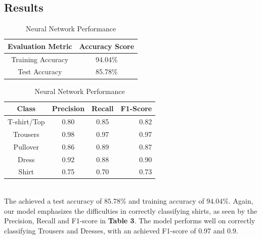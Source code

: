 \subsection{Results}\label{subsec:results}
\begin{table}[!ht]
\begin{subtable}[c]{0.4\textwidth}
\footnotesize
\centering
\begin{tabular}{ c | c }
 \toprule
 Evaluation Metric & Accuracy Score  \\
 \midrule
 Training Accuracy & 94.04\% \\
 Test Accuracy & 85.78\% \\
 \bottomrule
\end{tabular}
\captionsetup{justification=centering,margin=1cm}
\end{subtable}
\begin{subtable}[c]{0.6\textwidth}
\footnotesize
\centering
\begin{tabular}{c | c c r}
Class & Precision & Recall & F1-Score\\
\midrule
T-shirt/Top   &    0.80  &    0.85  &    0.82 \\
Trousers   &    0.98  &    0.97  &    0.97 \\
Pullover   &    0.86  &    0.89  &    0.87\\
Dress   &    0.92  &    0.88  &    0.90\\
Shirt   &    0.75  &    0.70  &    0.73\\
\end{tabular}
\captionsetup{justification=centering,margin=1cm}
\end{subtable}
\caption{Neural Network Performance}
\label{nn_evaluation}
\end{table}\\

The  achieved a test accuracy of $85.78\%$ and training accuracy of $94.04\%$.
Again, our model emphasizes the difficulties in correctly classifying shirts, as seen by the Precision, Recall and F1-score in \textbf{Table 3}.
The model performs well on correctly classifying Trousers and Dresses, with an achieved F1-score of 0.97 and 0.9.








